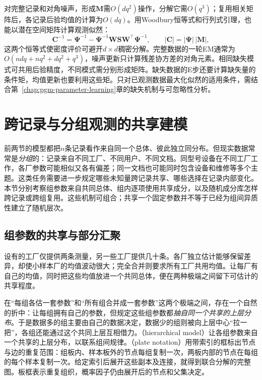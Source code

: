 对完整记录和对角噪声，形成$\bm M$需$O(dq^2)$操作，分解它需$O(q^3)$；复用相关矩阵后，各记录后验均值的计算为$O(dq)$。用Woodbury恒等式和行列式引理，也能以潜在空间矩阵计算观测似然：
\[
  \bm{C}^{-1}=\bm{\Psi}^{-1}
    -\bm{\Psi}^{-1}\bm{W}\bm{S}\bm{W}^{\top}\bm{\Psi}^{-1},
  \qquad |\bm{C}|=|\bm{\Psi}|\,|\bm{M}|,
\]
这两个恒等式使密度评价可避开$d\times d$稠密分解。完整数据的一轮EM通常为$O(ndq+nq^2+dq^2+q^3)$，噪声更新只计算残差协方差的对角元素。相同缺失模式可共用后验精度，不同模式需分别形成矩阵。缺失数据的E步还要计算缺失量的条件矩，均值更新也要利用这些矩。只对已观测数据最大化似然的适用条件，需结合第~\ref{chap:pgm-parameter-learning}章的缺失机制与可忽略性分析。

\section{跨记录与分组观测的共享建模}
\label{sec:pgm-static-directed-hierarchy-membership}

前两节的模型都把$n$条记录看作来自同一个总体、彼此独立同分布。但现实数据常常是\emph{分组}的：记录来自不同工厂、不同用户、不同文档。同型号设备在不同工厂工作，各厂参数可能相似又各有偏差；同一文档也可能同时包含设备和维修等多个主题。这类任务需要进一步规定哪些未知量跨记录共享、哪些选择在记录内部变化。本节分别考察组参数来自共同总体、组内逐项使用共享成分，以及随机成分库怎样跨记录或跨组复用。这些机制可组合；共享一个固定参数并不等于已经为组间异质性建立了随机层次。

\subsection{组参数的共享与部分汇聚}
\label{sec:pgm-static-directed-partial-pooling}

设有的工厂仅提供两条测量，另一些工厂提供几十条。各厂独立估计能够保留差异，却使小样本厂的均值波动很大；完全合并则要求所有工厂共用均值。让每厂有自己的均值，同时把这些均值放进一个共同总体，便在两种极端之间留下可估计的共享程度。

在“每组各估一套参数”和“所有组合并成一套参数”这两个极端之间，存在一个自然的折中：让每组拥有自己的参数，但规定这些组参数都\emph{抽自同一个共享的上层分布}。于是数据多的组主要由自己的数据决定，数据少的组则被向上层中心“拉一把”，各组还能通过这个共同上层互相借力。（hierarchical model）让各组参数来自一个共享的上层分布，以联系组间规律。（plate notation）用带索引的框标出节点与边的重复范围：组板内、样本板外的节点每组复制一次，两板内部的节点在每组的每个样本复制一次。给定索引后展开这些副本及连接，就得到联合分解的完整图。板框表示重复组织，概率因子仍由展开后的节点和父集决定。


